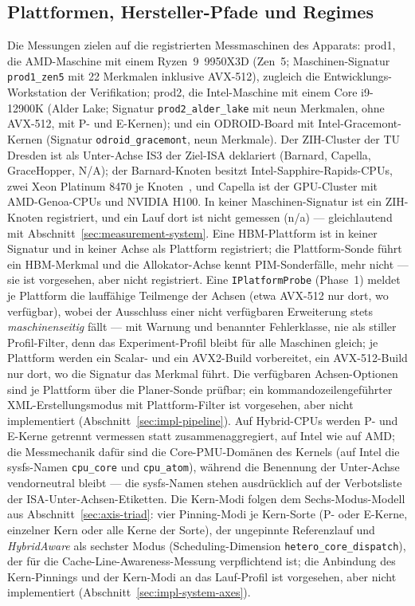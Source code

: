 \begin{nurlang}
\subsection{Plattformen, Hersteller-Pfade und Regimes}\label{sec:eval-platforms}
Die Messungen zielen auf die registrierten Messmaschinen des Apparats: prod1, die AMD-Maschine mit einem
Ryzen~9~9950X3D (Zen~5; Maschinen-Signatur \texttt{prod1\_zen5} mit 22 Merkmalen inklusive AVX-512), %
zugleich die Entwicklungs-Workstation der Verifikation; prod2, die Intel-Maschine mit einem Core
i9-12900K (Alder Lake; Signatur \texttt{prod2\_alder\_lake} mit neun Merkmalen, ohne AVX-512, mit P-
und E-Kernen); und ein ODROID-Board mit Intel-Gracemont-Kernen (Signatur \texttt{odroid\_gracemont},
neun Merkmale). Der ZIH-Cluster der TU Dresden ist als Unter-Achse IS3 der Ziel-ISA deklariert
(Barnard, Capella, GraceHopper, N/A); der Barnard-Knoten besitzt Intel-Sapphire-Rapids-CPUs, zwei Xeon
Platinum 8470 je Knoten~\cite{zih_hpc_compendium_hardware}, und Capella ist der GPU-Cluster mit
AMD-Genoa-CPUs und NVIDIA H100. In keiner Maschinen-Signatur ist ein ZIH-Knoten registriert, und ein
Lauf dort ist nicht gemessen (n/a) --- gleichlautend mit Abschnitt~\ref{sec:measurement-system}. Eine
HBM-Plattform ist in keiner Signatur und in keiner Achse als Plattform registriert; die Plattform-Sonde
führt ein HBM-Merkmal und die Allokator-Achse kennt PIM-Sonderfälle, mehr nicht --- sie ist
vorgesehen, aber nicht registriert. Eine \texttt{IPlatformProbe} (Phase~1) meldet je Plattform die lauffähige
Teilmenge der Achsen (etwa AVX-512 nur dort, wo verfügbar), wobei der Ausschluss einer nicht
verfügbaren Erweiterung stets \emph{maschinenseitig} fällt --- mit Warnung und benannter
Fehlerklasse, nie als stiller Profil-Filter, denn das Experiment-Profil bleibt für alle Maschinen
gleich; je Plattform werden ein Scalar- und ein AVX2-Build vorbereitet, ein AVX-512-Build nur dort, wo
die Signatur das Merkmal führt. Die verfügbaren Achsen-Optionen sind je Plattform über die
Planer-Sonde prüfbar; ein kommandozeilengeführter XML-Erstellungsmodus mit Plattform-Filter ist
vorgesehen, aber nicht implementiert (Abschnitt~\ref{sec:impl-pipeline}). Auf
Hybrid-CPUs werden P- und E-Kerne getrennt vermessen statt zusammenaggregiert, auf Intel wie auf AMD\@;
die Messmechanik dafür sind die Core-PMU-Domänen des Kernels (auf Intel die sysfs-Namen
\texttt{cpu\_core} und \texttt{cpu\_atom}), während die Benennung der Unter-Achse vendorneutral bleibt
--- die sysfs-Namen stehen ausdrücklich auf der Verbotsliste der ISA-Unter-Achsen-Etiketten. Die
Kern-Modi folgen dem Sechs-Modus-Modell aus Abschnitt~\ref{sec:axis-triad}: vier Pinning-Modi je
Kern-Sorte (P- oder E-Kerne, einzelner Kern oder alle Kerne der Sorte), der ungepinnte Referenzlauf
und \emph{HybridAware} als sechster Modus (Scheduling-Dimension \texttt{hetero\_core\_dispatch}), der
für die Cache-Line-Awareness-Messung verpflichtend ist; die Anbindung des Kern-Pinnings und der
Kern-Modi an das Lauf-Profil ist vorgesehen, aber nicht implementiert (Abschnitt~\ref{sec:impl-system-axes}).
\end{nurlang}
